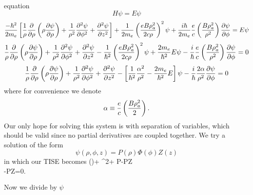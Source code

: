 \documentclass[11pt,letterpaper]{article}
\begin{document}
		equation
		\[
			H\psi = E\psi
		\]
		\[
			\frac{-\h^2}{2m_e}\blr{\frac 1\rho \frac{\partial}{\partial \rho}\left(\rho\frac{\partial\psi}{\partial\rho}\right)+\frac{1}
			{\rho^2}\frac{\partial^2\psi}{\partial\phi^2}+ \frac{\partial^2\psi}{\partial z^2}}+\frac{1}{2m_e}\pfrac{eB\rho_a^2}{2c\rho}^2\psi
			+\frac{i\h}{2m_e}\frac{e}{c}\pfrac{B\rho_a^2}{\rho^2}\pdiff[\psi]{\phi}=E\psi
		\]
		\[
			\frac 1\rho \frac{\partial}{\partial \rho}\left(\rho\frac{\partial\psi}{\partial\rho}\right)+\frac{1}
			{\rho^2}\frac{\partial^2\psi}{\partial\phi^2}+ \frac{\partial^2\psi}{\partial z^2}-\frac{1}{\h^2}\pfrac{eB\rho_a^2}{2c\rho}^2\psi+
			\frac{2m_e}{\h^2}E\psi-\frac{i}{\h}\frac{e}{c}\pfrac{B\rho_a^2}{\rho^2}\pdiff[\psi]{\phi}=0
		\]
		\[
			\frac 1\rho \frac{\partial}{\partial \rho}\left(\rho\frac{\partial\psi}{\partial\rho}\right)+\frac{1}
			{\rho^2}\frac{\partial^2\psi}{\partial\phi^2}+ \frac{\partial^2\psi}{\partial z^2}-\blr{\frac{1}{\h^2}\frac{\alpha^2}{\rho^2}-
			\frac{2m_e}{\h^2}E}\psi-\frac{i}{\h}\frac{2\alpha}{\rho^2}\pdiff[\psi]{\phi}=0
		\]
		where for convenience we denote
		\[
			\alpha \equiv \frac{e}{c}\pfrac{B\rho_a^2}{2}.
		\]
		Our only hope for solving this system is with separation of variables, which should be valid since no partial derivatives are coupled
		together. We try a solution of the form
		\[
			\psi(\rho,\phi,z) = P(\rho)\Phi(\phi)Z(z)
		\]
		in which our TISE becomes
		\ba
			 \frac{\partial}{\partial \rho}\left(\rho{}\right)+
			{\rho^2}+ P\Phi{}-P\Phi Z\\
			-PZ\pdiff[\Phi]{\phi}=0.
		\ea
		
		Now we divide by $\psi$
		
\end{document}
